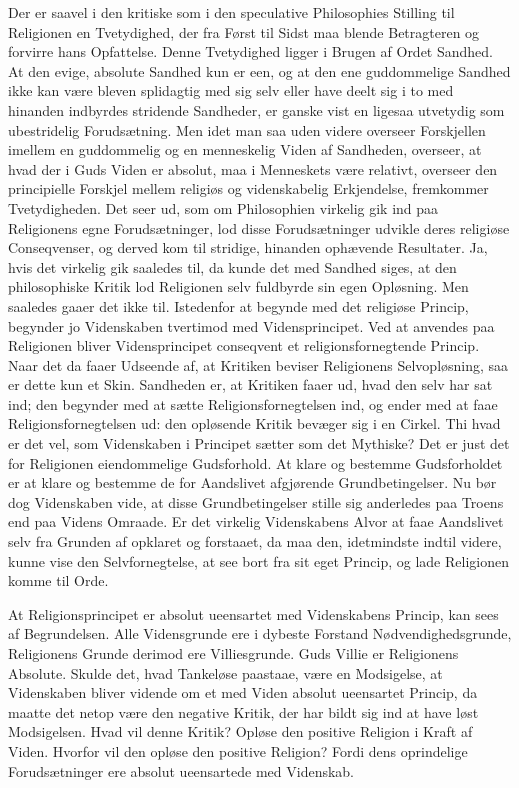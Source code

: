 \documentclass[12pt,a4paper]{article}
\begin{document}
Der er saavel i den kritiske som i den speculative Philosophies
Stilling til Religionen en Tvetydighed, der fra Først til Sidst
maa blende Betragteren og forvirre hans Opfattelse. Denne
Tvetydighed ligger i Brugen af Ordet Sandhed. At den evige,
absolute Sandhed kun er een, og at den ene guddommelige Sandhed
ikke kan være bleven splidagtig med sig selv eller have deelt
sig i to med hinanden indbyrdes stridende Sandheder, er ganske
vist en ligesaa utvetydig som ubestridelig Forudsætning. Men
idet man saa uden videre overseer Forskjellen imellem en
guddommelig og en menneskelig Viden af Sandheden, overseer, at
hvad der i Guds Viden er absolut, maa i Menneskets være relativt,
overseer den principielle Forskjel mellem religiøs og
videnskabelig Erkjendelse, fremkommer Tvetydigheden. Det seer
ud, som om Philosophien virkelig gik ind paa Religionens egne
Forudsætninger, lod disse Forudsætninger udvikle deres religiøse
Conseqvenser, og derved kom til stridige, hinanden ophævende
Resultater. Ja, hvis det virkelig gik saaledes til, da kunde det
med Sandhed siges, at den philosophiske Kritik lod Religionen
selv fuldbyrde sin egen Opløsning. Men saaledes gaaer det ikke
til. Istedenfor at begynde med det religiøse Princip, begynder
jo Videnskaben tvertimod med Vidensprincipet. Ved at anvendes
paa Religionen bliver Vidensprincipet conseqvent et
religionsfornegtende Princip. Naar det da faaer Udseende af, at
Kritiken beviser Religionens Selvopløsning, saa er dette kun et
Skin. Sandheden er, at Kritiken faaer ud, hvad den selv har sat
ind; den begynder med at sætte Religionsfornegtelsen ind, og
ender med at faae Religionsfornegtelsen ud: den opløsende Kritik
bevæger sig i en Cirkel. Thi hvad er det vel, som Videnskaben i
Principet sætter som det Mythiske? Det er just det for
Religionen eiendommelige Gudsforhold. At klare og bestemme
Gudsforholdet er at klare og bestemme de for Aandslivet
afgjørende Grundbetingelser. Nu bør dog Videnskaben vide, at
disse Grundbetingelser stille sig anderledes paa Troens end paa
Videns Omraade. Er det virkelig Videnskabens Alvor at faae
Aandslivet selv fra Grunden af opklaret og forstaaet, da maa
den, idetmindste indtil videre, kunne vise den Selvfornegtelse,
at see bort fra sit eget Princip, og lade Religionen komme til
Orde.

At Religionsprincipet er absolut ueensartet med Videnskabens
Princip, kan sees af Begrundelsen. Alle Vidensgrunde ere i
dybeste Forstand Nødvendighedsgrunde, Religionens Grunde
derimod ere Villiesgrunde. Guds Villie er Religionens Absolute.
Skulde det, hvad Tankeløse paastaae, være en Modsigelse, at
Videnskaben bliver vidende om et med Viden absolut ueensartet
Princip, da maatte det netop være den negative Kritik, der har
bildt sig ind at have løst Modsigelsen. Hvad vil denne Kritik?
Opløse den positive Religion i Kraft af Viden. Hvorfor vil den
opløse den positive Religion? Fordi dens oprindelige
Forudsætninger ere absolut ueensartede med Videnskab.
\end{document}
